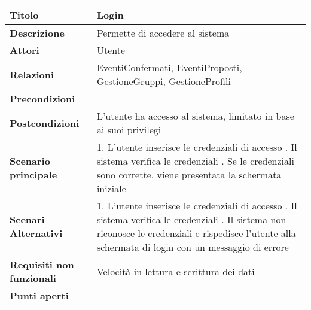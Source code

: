 \begin{tabular} {|P{4.5cm}|P{11cm}|}
  \hline
  \textbf{Titolo}                   & Login                                                              \\
  \hline
  \textbf{Descrizione}              & Permette di accedere al sistema                                    \\
  \hline
  \textbf{Attori}                   & Utente                                                             \\
  \hline
  \textbf{Relazioni}                & EventiConfermati, EventiProposti, GestioneGruppi, GestioneProfili  \\
  \hline
  \textbf{Precondizioni}            &                                                                    \\
  \hline
  \textbf{Postcondizioni}           & L'utente ha accesso al sistema, limitato in base ai suoi privilegi \\
  \hline
  \textbf{Scenario principale}      & 1. L'utente inserisce le credenziali di
  accesso . Il sistema verifica le credenziali . Se le
  credenziali sono corrette, viene presentata la schermata iniziale                                      \\
  \hline
  \textbf{Scenari Alternativi}      & 1. L'utente inserisce le
  credenziali di accesso . Il sistema verifica le credenziali
  . Il sistema non riconosce le credenziali e rispedisce l'utente
  alla schermata di login con un messaggio di errore                                                     \\
  \hline
  \textbf{Requisiti non funzionali} & Velocità in lettura e scrittura dei dati\linebreak                 \\
  \hline
  \textbf{Punti aperti}             &                                                                    \\
  \hline
\end{tabular}
\hfill
\break

